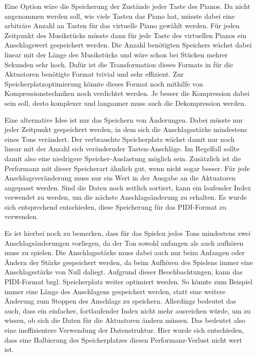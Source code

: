Eine Option wäre die Speicherung der Zustände jeder Taste des Pianos.
Da nicht angenommen werden soll, wie viele Tasten das Piano hat, müsste dabei eine arbiträre Anzahl an Tasten für das virtuelle Piano gewählt werden.
Für jeden Zeitpunkt des Musikstücks müsste dann für jede Taste des virtuellen Pianos ein Anschlagswert gespeichert werden.
Die Anzahl benötigten Speichers wächst dabei linear mit der Länge des Musikstücks und wäre schon bei Stücken mehrer Sekunden sehr hoch.
Dafür ist die Transformation dieses Formats in für die Aktuatoren benötigte Format trivial und sehr effizient.
Zur Speicherplatzoptimierung könnte dieses Format noch mithilfe von Kompressionstechniken noch verdichtet werden.
Je besser die Kompression dabei sein soll, desto komplexer und langsamer muss auch die Dekompression werden.

Eine alternative Idee ist nur das Speichern von Änderungen.
Dabei müsste nur jeder Zeitpunkt gespeichert werden, in dem sich die Anschlagsstärke mindestens eines Tons verändert.
Der verbrauchte Speicherplatz wächst damit nur noch linear mit der Anzahl sich verändernder Tasten-Anschläge.
Im Regelfall sollte damit also eine niedrigere Speicher-Auslastung möglich sein.
Zusätzlich ist die Performanz mit dieser Speicherart ähnlich gut, wenn nicht sogar besser.
Für jede Anschlagsveränderung muss nur ein Wert in der Ausgabe an die Aktuatoren angepasst werden.
Sind die Daten noch zeitlich sortiert, kann ein laufender Index verwendet zu werden, um die nächste Anschlagsänderung zu erhalten.
Es wurde sich entsprechend entschieden, diese Speicherung für das \ac{PIDI}-Format zu verwenden.

Es ist hierbei noch zu bemerken, dass für das Spielen jedes Tons mindestens zwei Anschlagsänderungen vorliegen, da der Ton sowohl anfangen als auch aufhören muss zu spielen.
Die Anschlagsstärke muss dabei auch nur beim Anfangen oder Ändern der Stärke gespeichert werden, da beim Aufhören des Spielens immer eine Anschlagsstärke von Null daliegt.
Aufgrund dieser Beochbachtungen, kann das \ac{PIDI}-Format bzgl. Speicherplatz weiter optimiert werden.
So könnte zum Beispiel immer eine Länge des Anschlagens gespeichert werden, statt eine weitere Änderung zum Stoppen des Anschlags zu speichern.
Allerdings bedeutet das auch, dass ein einfacher, fortlaufender Index nicht mehr ausreichen würde, um zu wissen, ob sich die Daten für die Aktuatoren ändern müssen.
Das bedeutet also eine ineffizientere Verwendung der Datenstruktur.
Hier wurde sich entschieden, dass eine Halbierung des Speicherplatzes diesen Performanz-Verlust nicht wert ist.

